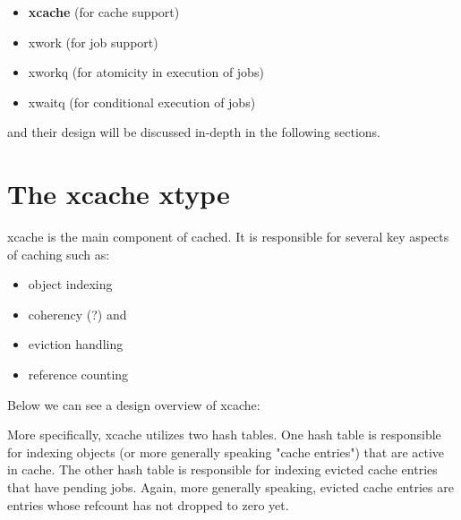 \begin{comment}
More specifically, cached consists of the cache provided by xcache aasfs as safa
asfasfnd a
pre-allocated number of objects. An object is divided in buckets and its size,
as well as bucket size, are defined by the user.

The fact that objects are pre-allocated means two things:

1) We don't need to care about memory fragmentation and system call overhead
2) We cannot index single buckets. <FILLME>
\end{comment}

\begin{itemize}
	\item \textbf{xcache} (for cache support)
	\item xwork (for job support)
	\item xworkq (for atomicity in execution of jobs)
	\item xwaitq (for conditional execution of jobs)
\end{itemize}

and their design will be discussed in-depth in the following sections.

\section{The xcache xtype}

xcache is the main component of cached. It is responsible for several key 
aspects of caching such as:

\begin{itemize}
	\item object indexing
	\item coherency (?) and
	\item eviction handling
	\item reference counting
\end{itemize}

Below we can see a design overview of xcache:


More specifically, xcache utilizes two hash tables. One hash table is 
responsible for indexing objects (or more generally speaking "cache entries") 
that are active in cache.  The other hash table is responsible for indexing 
evicted cache entries that have pending jobs.  Again, more generally speaking, 
evicted cache entries are entries whose refcount has not dropped to zero yet.

